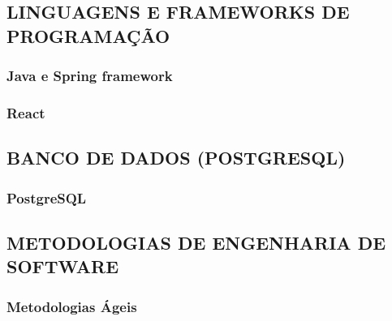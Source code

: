     \subsection{LINGUAGENS E FRAMEWORKS DE PROGRAMAÇÃO}

        \subsubsection*{Java e Spring framework}

        \subsubsection*{React}

    \subsection{BANCO DE DADOS (POSTGRESQL)}

        \subsubsection*{PostgreSQL}

    \subsection{METODOLOGIAS DE ENGENHARIA DE SOFTWARE}

        \subsubsection*{Metodologias Ágeis}
        